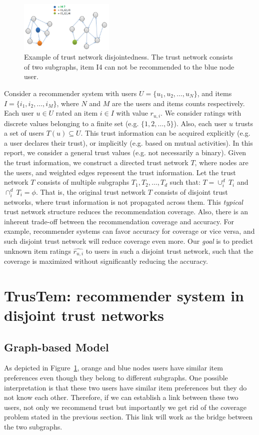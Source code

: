 \documentclass[11pt, conference, onecolumn]{IEEEtran}
\begin{document}
\begin{figure}[tp]
\centering
\includegraphics[width=0.4\textwidth]{fig1}
\caption{Example of trust network disjointedness. The trust network consists of two subgraphs, item I4 can not be recommended to the blue node user.}
\label{fig:motiv}
\end{figure}

Consider a recommender system with users $U = \{u_1, u_2, \dots, u_N \}$, and items $I = \{i_1, i_2, \dots, i_M \}$, where $N$ and $M$ are the users and items counts respectively. Each user $u \in U$ rated an item $i \in I$ with value $r_{u,i}$. We consider ratings with discrete values belonging to a finite set (e.g. $\{1,2,\dots,5\}$). Also, each user $u$ trusts a set of users $T(u) \subseteq U$. This trust information can be acquired explicitly (e.g. a user declares their trust), or implicitly (e.g. based on mutual activities). In this report, we consider a general trust values (e.g. not necessarily a binary). Given the trust information, we construct a directed trust network $T$, where nodes are the users, and weighted edges represent the trust information. Let the trust network $T$ consists of multiple subgraphs $T_1, T_2, \dots, T_d$ such that: $T = \cup_i^d~T_i$ and $\cap_i^d~T_i = \phi$. That is, the original trust network $T$ consists of disjoint trust networks, where trust information is not propagated across them. This \textit{typical} trust network structure reduces the recommendation coverage. Also, there is an inherent trade-off between the recommendation coverage and accuracy. For example, recommender systems can favor accuracy for coverage or vice versa, and such disjoint trust network will reduce coverage even more. Our \textit{goal} is to predict unknown item ratings $\widehat{r_{u,i}}$ to users in such a disjoint trust network, such that the coverage is maximized without significantly reducing the accuracy.


\section{TrusTem: recommender system in disjoint trust networks} \label{sec:solution}

\subsection{Graph-based Model}
As depicted in Figure~\ref{fig:motiv}, orange and blue nodes users have similar item preferences even though they belong to different subgraphs. One possible interpretation is that these two users have similar item preferences but they do not know each other. Therefore, if we can establish a link between these two users, not only we recommend trust but importantly we get rid of the coverage problem stated in the previous section. This link will work as the bridge between the two subgraphs.
\end{document}
